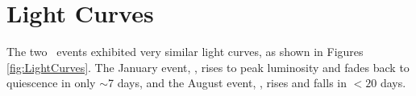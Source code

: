 \section{Light Curves}\label{sec:LightCurves}

The two \spock\ events exhibited very similar light curves, as shown in Figures \ref{fig:LightCurves}.  The January event, \spockone, rises to peak luminosity and fades back to quiescence in only $\sim$7 days, and the August event, \spocktwo, rises and falls in $<20$ days.  
  
  
  